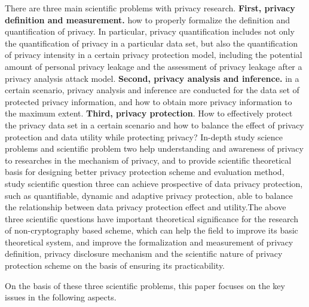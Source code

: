 \documentclass[pdftex,notypeinfo,twoside,openany,UTF8,fntef]{CASthesis}
\theoremstyle{THrm}{
	\newtheorem{question}{Question}[section]
	\newtheorem{property}{性质}[section]
	\newtheorem{assumption}{假设}[section]
	\newtheorem{claim}[lemma]{断言}
	
}
\begin{document}
There are three main scientific problems with privacy research. \textbf{First, privacy definition and measurement.} how to properly formalize the definition and quantification of privacy. In particular, privacy quantification includes not only the quantification of privacy in a particular data set, but also the quantification of privacy intensity in a certain privacy protection model, including the potential amount of personal privacy leakage and the assessment of privacy leakage after a privacy analysis attack model. \textbf{Second, privacy analysis and inference.} in a certain scenario, privacy analysis and inference are conducted for the data set of protected privacy information, and how to obtain more privacy information to the maximum extent. \textbf{Third, privacy protection}. How to effectively protect the privacy data set in a certain scenario and how to balance the effect of privacy protection and data utility while protecting privacy? In-depth study science problems and scientific problem two help understanding and awareness of privacy to researches in the mechanism of privacy, and to provide scientific theoretical basis for designing better privacy protection scheme and evaluation method, study scientific question three can achieve prospective of data privacy protection, such as quantifiable, dynamic and adaptive privacy protection, able to balance the relationship between data privacy protection effect and utility.The above three scientific questions have important theoretical significance for the research of non-cryptography based scheme, which can help the field to improve its basic theoretical system, and improve the formalization and measurement of privacy definition, privacy disclosure mechanism and the scientific nature of privacy protection scheme on the basis of ensuring its practicability.

On the basis of these three scientific problems, this paper focuses on the key issues in the following aspects.
\end{document}

